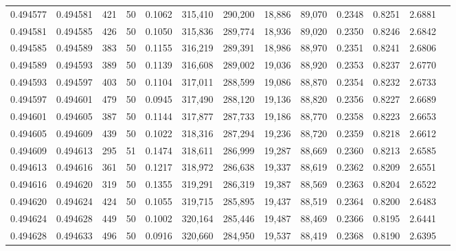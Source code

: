 \begin{tabular}{rrrrrrrrrrrrr}
0.494577 & 0.494581 &   421 &  50 &                                     0.1062 & 315,410 & 290,200 &  18,886 &  89,070 & 0.2348 & 0.8251 & 2.6881 \\
0.494581 & 0.494585 &   426 &  50 &                                     0.1050 & 315,836 & 289,774 &  18,936 &  89,020 & 0.2350 & 0.8246 & 2.6842 \\
0.494585 & 0.494589 &   383 &  50 &                                     0.1155 & 316,219 & 289,391 &  18,986 &  88,970 & 0.2351 & 0.8241 & 2.6806 \\
0.494589 & 0.494593 &   389 &  50 &                                     0.1139 & 316,608 & 289,002 &  19,036 &  88,920 & 0.2353 & 0.8237 & 2.6770 \\
0.494593 & 0.494597 &   403 &  50 &                                     0.1104 & 317,011 & 288,599 &  19,086 &  88,870 & 0.2354 & 0.8232 & 2.6733 \\
0.494597 & 0.494601 &   479 &  50 &                                     0.0945 & 317,490 & 288,120 &  19,136 &  88,820 & 0.2356 & 0.8227 & 2.6689 \\
0.494601 & 0.494605 &   387 &  50 &                                     0.1144 & 317,877 & 287,733 &  19,186 &  88,770 & 0.2358 & 0.8223 & 2.6653 \\
0.494605 & 0.494609 &   439 &  50 &                                     0.1022 & 318,316 & 287,294 &  19,236 &  88,720 & 0.2359 & 0.8218 & 2.6612 \\
0.494609 & 0.494613 &   295 &  51 &                                     0.1474 & 318,611 & 286,999 &  19,287 &  88,669 & 0.2360 & 0.8213 & 2.6585 \\
0.494613 & 0.494616 &   361 &  50 &                                     0.1217 & 318,972 & 286,638 &  19,337 &  88,619 & 0.2362 & 0.8209 & 2.6551 \\
0.494616 & 0.494620 &   319 &  50 &                                     0.1355 & 319,291 & 286,319 &  19,387 &  88,569 & 0.2363 & 0.8204 & 2.6522 \\
0.494620 & 0.494624 &   424 &  50 &                                     0.1055 & 319,715 & 285,895 &  19,437 &  88,519 & 0.2364 & 0.8200 & 2.6483 \\
0.494624 & 0.494628 &   449 &  50 &                                     0.1002 & 320,164 & 285,446 &  19,487 &  88,469 & 0.2366 & 0.8195 & 2.6441 \\
0.494628 & 0.494633 &   496 &  50 &                                     0.0916 & 320,660 & 284,950 &  19,537 &  88,419 & 0.2368 & 0.8190 & 2.6395 \\

\end{tabular}
